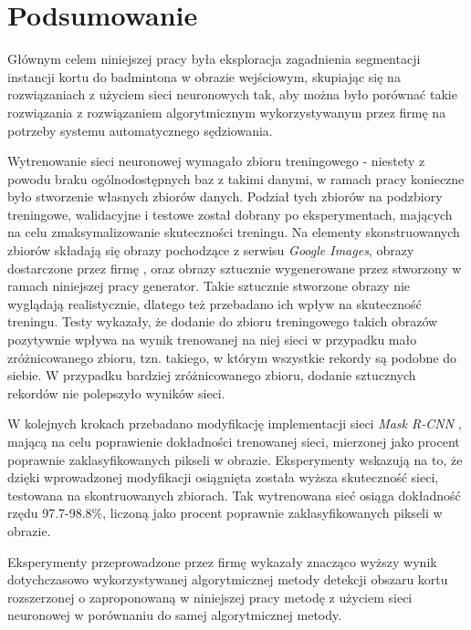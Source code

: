 \chapter{Podsumowanie}

Głównym celem niniejszej pracy była eksploracja zagadnienia segmentacji instancji kortu do badmintona w obrazie wejściowym, skupiając się na rozwiązaniach z użyciem sieci neuronowych tak, aby można było porównać takie rozwiązania z rozwiązaniem algorytmicznym wykorzystywanym przez firmę \blue{} na potrzeby systemu automatycznego sędziowania.

Wytrenowanie sieci neuronowej wymagało zbioru treningowego - niestety z powodu braku ogólnodostępnych baz z takimi danymi, w ramach pracy konieczne było stworzenie własnych zbiorów danych. Podział tych zbiorów na podzbiory treningowe, walidacyjne i testowe został dobrany po eksperymentach, mających na celu zmaksymalizowanie skuteczności treningu. Na elementy skonstruowanych zbiorów składają się obrazy pochodzące z serwisu \textit{Google Images}, obrazy dostarczone przez firmę \blue{}, oraz obrazy sztucznie wygenerowane przez stworzony w ramach niniejszej pracy generator. Takie sztucznie stworzone obrazy nie wyglądają realistycznie, dlatego też przebadano ich wpływ na skuteczność treningu. Testy wykazały, że dodanie do zbioru treningowego takich obrazów pozytywnie wpływa na wynik trenowanej na niej sieci w przypadku mało zróżnicowanego zbioru, tzn. takiego, w którym wszystkie rekordy są podobne do siebie. W przypadku bardziej zróżnicowanego zbioru, dodanie sztucznych rekordów nie polepszyło wyników sieci.

W kolejnych krokach przebadano modyfikację implementacji sieci \textit{Mask R-CNN} \cite{matterport-mask-rcnn}, mającą na celu poprawienie dokładności trenowanej sieci, mierzonej jako procent poprawnie zaklasyfikowanych pikseli w obrazie. Eksperymenty wskazują na to, że dzięki wprowadzonej modyfikacji osiągnięta została wyższa skuteczność sieci, testowana na skontruowanych zbiorach. Tak wytrenowana sieć osiąga dokładność rzędu 97.7-98.8\%, liczoną jako procent poprawnie zaklasyfikowanych pikseli w obrazie. 

Eksperymenty przeprowadzone przez firmę \blue{} wykazały znacząco wyższy wynik dotychczasowo wykorzystywanej algorytmicznej metody detekcji obszaru kortu rozszerzonej o zaproponowaną w niniejszej pracy metodę z użyciem sieci neuronowej w porównaniu do samej algorytmicznej metody.

